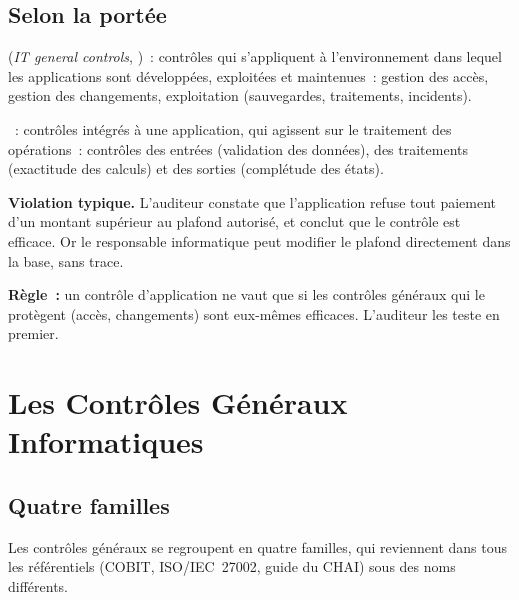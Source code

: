 \subsection{Selon la portée}

\begin{boxdef}
 (\textit{IT general controls}, )~: contrôles qui
s'appliquent à l'environnement dans lequel les applications sont
développées, exploitées et maintenues~: gestion des accès, gestion des
changements, exploitation (sauvegardes, traitements, incidents).

\medskip
{}~:
contrôles intégrés à une application, qui agissent sur le traitement des
opérations~: contrôles des entrées (validation des données), des traitements
(exactitude des calculs) et des sorties (complétude des états).
\end{boxdef}

\begin{boxalert}
\textbf{Violation typique.} L'auditeur constate que l'application refuse tout
paiement d'un montant supérieur au plafond autorisé, et conclut que le
contrôle est efficace. Or le responsable informatique peut modifier le
plafond directement dans la base, sans trace.

\smallskip
\textbf{Règle~:} un contrôle d'application ne vaut que si les contrôles
généraux qui le protègent (accès, changements) sont eux-mêmes efficaces.
L'auditeur les teste en premier.
\end{boxalert}

\section{Les Contrôles Généraux Informatiques}
\label{sec:c03-itgc}

\subsection{Quatre familles}

Les contrôles généraux se regroupent en quatre familles, qui reviennent
dans tous les référentiels (COBIT, ISO/IEC~27002, guide du CHAI) sous des
noms différents.

